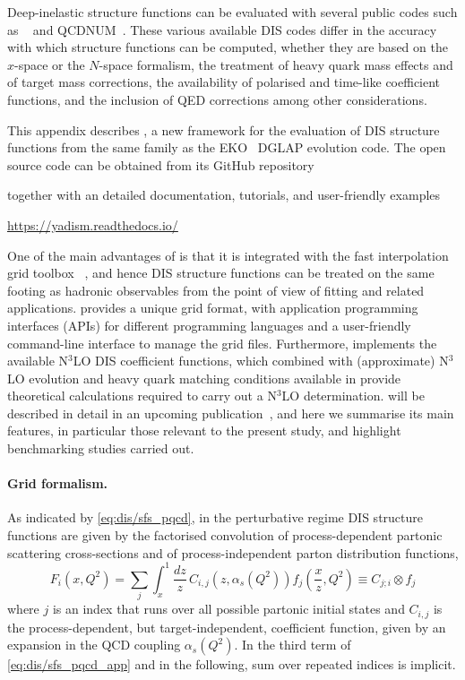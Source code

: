 
Deep-inelastic structure functions can be evaluated with several public codes
such as \apfel~\cite{Bertone:2013vaa} and \textsc{\small
QCDNUM}~\cite{Botje:2010ay}.
%
These various available DIS codes differ in the accuracy with which structure
functions can be computed, whether they are based on the $x$-space or the
$N$-space formalism, the treatment of heavy quark mass effects and of target
mass corrections, the availability of polarised and time-like coefficient
functions, and the inclusion of QED corrections among  other considerations.

This appendix describes \yadism, a new framework for the evaluation of DIS
structure functions from the same family as the \textsc{\small
EKO}~\cite{Candido:2022tld} DGLAP evolution code.
%
The open source \yadism code can be obtained from its GitHub repository
\begin{center}
\end{center}  
together with an detailed documentation, tutorials, and user-friendly examples
\begin{center}
  \url{https://yadism.readthedocs.io/}
\end{center}  
One of the main advantages of \yadism is that it is integrated with the fast
interpolation grid toolbox \pineappl~\cite{Carrazza:2020gss},
and hence DIS structure functions can be treated on the same footing as
hadronic observables from the point of view of \pdf{} fitting and related
applications.
%
\pineappl provides a unique grid format, with application
programming interfaces (APIs) for different programming languages and a
user-friendly command-line interface to manage the grid files.
%
Furthermore, \yadism implements the available N$^3$LO DIS coefficient
functions, which combined with (approximate)  N$^3$LO evolution and heavy quark
matching conditions available in \eko provide theoretical
calculations required to carry out a N$^3$LO \pdf{} determination.
%
\yadism will be described in detail in an upcoming publication~\cite{yadism},
and here we summarise its main features, in particular those relevant to the
present study, and highlight benchmarking studies carried out.

\paragraph{Grid formalism.}
%
As indicated by \cref{eq:dis/sfs_pqcd}, in the perturbative regime DIS
structure functions are given by the factorised convolution of
process-dependent partonic scattering cross-sections and of process-independent
parton distribution functions,
\begin{equation}
F_i(x,Q^2) = \sum_{j}\int_x^1 \frac{dz}{z}\, C_{i,j}(z,\alpha_s(Q^2))f_j\left( \frac{x}{z},Q^2\right) \equiv
C_{j; i} \otimes f_j
\label{eq:dis/sfs_pqcd_app}
 \end{equation}
 where $j$ is an index that runs over all possible partonic initial states and
 $C_{i,j}$ is the process-dependent, but target-independent, coefficient
 function, given by an expansion in the QCD coupling $\alpha_s(Q^2)$.
 In the third term of \cref{eq:dis/sfs_pqcd_app} and in the following, sum
 over repeated indices is implicit.
 
